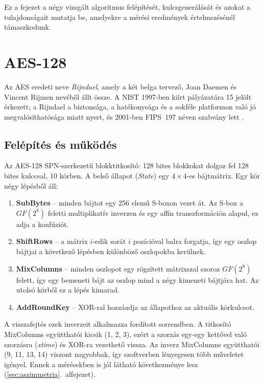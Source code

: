 \documentclass[a4paper,12pt]{report}
\theoremstyle{definition}
\theoremstyle{remark}
\begin{document}
Ez a fejezet a négy vizsgált algoritmus felépítését, kulcsgenerálását és azokat a tulajdonságait mutatja be, amelyekre a mérési eredmények értelmezésénél támaszkodunk.

\section{AES-128}\label{sec:aes}

Az AES eredeti neve \emph{Rijndael}, amely a két belga tervező, Joan Daemen és Vincent Rijmen nevéből állt össze. A NIST 1997-ben kiírt pályázatára 15 jelölt érkezett; a Rijndael a biztonsága, a hatékonysága és a sokféle platformon való jó megvalósíthatósága miatt nyert, és 2001-ben FIPS~197 néven szabvány lett \cite{FIPS197,DaemenRijmen2002}.

\subsection{Felépítés és működés}\label{sec:aes_struktura}

Az AES-128 SPN-szerkezetű blokktitkosító: 128 bites blokkokat dolgoz fel 128 bites kulccsal, 10 körben. A belső állapot (\emph{State}) egy $4 \times 4$-es bájtmátrix. Egy kör négy lépésből áll:

\begin{enumerate}
	\item \textbf{SubBytes} -- minden bájtot egy 256 elemű S-boxon vezet át. Az S-box a $GF(2^8)$ feletti multiplikatív inverzen és egy affin transzformáción alapul, ez adja a konfúziót.
	\item \textbf{ShiftRows} -- a mátrix $i$-edik sorát $i$ pozícióval balra forgatja, így egy oszlop bájtjai a következő lépésben különböző oszlopokba kerülnek.
	\item \textbf{MixColumns} -- minden oszlopot egy rögzített mátrixszal szoroz $GF(2^8)$ felett, így egy bemeneti bájt az oszlop mind a négy kimeneti bájtjára hat. Az utolsó körből ez a lépés kimarad.
	\item \textbf{AddRoundKey} -- XOR-ral hozzáadja az állapothoz az aktuális körkulcsot.
\end{enumerate}

A visszafejtés ezek inverzeit alkalmazza fordított sorrendben. A titkosító MixColumns együtthatói kicsik (1, 2, 3), ezért a szorzás egy-egy kettővel való szorzásra (\emph{xtime}) és XOR-ra vezethető vissza. Az inverz MixColumns együtthatói (9, 11, 13, 14) viszont nagyobbak, így szoftverben lényegesen több műveletet igényel. Ennek a mérésekben is jól látható következménye lesz (\ref{sec:aszimmetria}.~alfejezet).
\end{document}
